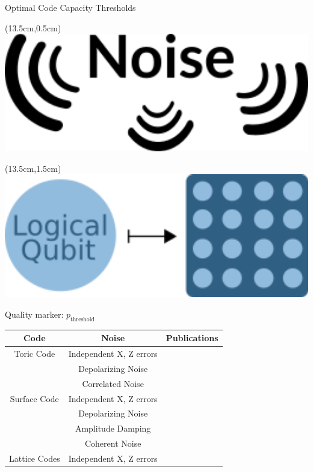 \documentclass{dfki}
\begin{document}
\begin{frame}{Optimal Code Capacity Thresholds}
	\begin{textblock*}{2cm}(13.5cm,0.5cm)
		\includegraphics[width=1\textwidth]{fig/slim_noise.png}
	\end{textblock*}
	\begin{textblock*}{2cm}(13.5cm,1.5cm)
		\includegraphics[width=1\textwidth]{fig/QEC_pure_code.png}
	\end{textblock*}
	Quality marker: $p_{\text{threshold}}$
	\begin{table}[h]
        \renewcommand{\arraystretch}{1.5} %
        \small
		\begin{tabular}{c|c|c}
			\textbf{Code} & \textbf{Noise} & \textbf{Publications} \\
			\hline
			Toric Code & Independent X, Z errors & \cite{merz_two-dimensional_2001, honecker_nishimori_2001} \\
			 & Depolarizing Noise & \cite{bombin_strong_2012} \\
			 & Correlated Noise & \cite{chubb_statistical_2019}\\
			\hline
			Surface Code & Independent X, Z errors & \cite{bravyi_efficient_2014} \\
			& Depolarizing Noise & \cite{bravyi_efficient_2014} \\
			& Amplitude Damping & \cite{darmawan_tensor-network_2017} \\
			& Coherent Noise & \cite{behrends_statistical_2024, bao_phases_2024} \\
			\hline
			Lattice Codes & Independent X, Z errors & \cite{fujii_error-_2012} \\
		\end{tabular}
	\end{table}
\end{frame}
\end{document}
